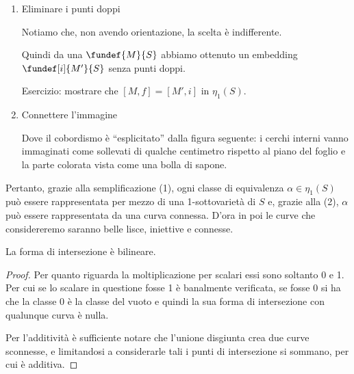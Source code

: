 \begin{enumerate}
\item Eliminare i punti doppi
\begin{center}
  
\end{center}
Notiamo che, non avendo orientazione, la scelta è indifferente.

Quindi da una $\fundef{M}{S}$ abbiamo ottenuto un embedding $\fundef[i]{M'}{S}$ senza punti doppi.

Esercizio: mostrare che $[M,f] = [M',i]$ in $\eta_1(S)$.

\item Connettere l'immagine
\begin{center}
	\def\svgwidth{11cm}
  
\end{center}
Dove il cobordismo è ``esplicitato'' dalla figura seguente: i cerchi interni vanno immaginati come sollevati di qualche centimetro rispetto al piano del foglio e la parte colorata vista come una bolla di sapone.
\begin{center}
	\def\svgwidth{11cm}
  
\end{center}
\end{enumerate}

Pertanto, grazie alla semplificazione (1), ogni classe di equivalenza  $\alpha \in \eta_1(S)$ può essere rappresentata per mezzo di una 1-sottovarietà di $S$ e, grazie alla (2), $\alpha$ può essere rappresentata da una curva connessa. D'ora in poi le curve che considereremo saranno belle lisce, iniettive e connesse.

\begin{prop}[Fantasma]
La forma di intersezione è bilineare.
\end{prop}
\begin{proof}
Per quanto riguarda la moltiplicazione per scalari essi sono soltanto 0 e 1. Per cui se lo scalare in questione fosse 1 è banalmente verificata, se fosse 0 si ha che la classe 0 è la classe del vuoto e quindi la sua forma di intersezione con qualunque curva è nulla.

Per l'additività è sufficiente notare che l'unione disgiunta crea due curve sconnesse, e limitandosi a considerarle tali i punti di intersezione si sommano, per cui è additiva.
\end{proof}


